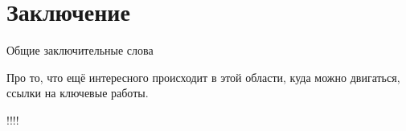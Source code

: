 ﻿\section{Заключение}

Общие заключительные слова

Про то, что ещё интересного происходит в этой области, куда можно двигаться, ссылки на ключевые работы.

!!!!